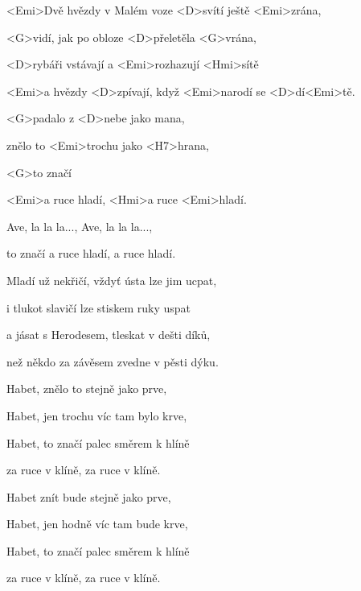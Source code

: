 

\zs
<Emi>Dvě hvězdy v Malém voze <D>svítí ještě <Emi>zrána,

<G>vidí, jak po obloze <D>přeletěla <G>vrána,

<D>rybáři vstávají a <Emi>rozhazují <Hmi>sítě

<Emi>a hvězdy <D>zpívají, když <Emi>narodí se <D>dí<Emi>tě.
\ks

\zr
{} <G>padalo z <D>nebe jako mana,

 znělo to <Emi>trochu jako <H7>hrana,

 <G>to značí 

<Emi>a ruce hladí, <Hmi>a ruce <Emi>hladí.

Ave, la la la..., Ave, la la la...,

 to značí  a ruce hladí, a ruce hladí.
\kr

\zs
Mladí už nekřičí, vždyť ústa lze jim ucpat,

i tlukot slavičí lze stiskem ruky uspat

a jásat s Herodesem, tleskat v dešti díků,

než někdo za závěsem zvedne v pěsti dýku.
\ks

\zr
Habet, znělo to stejně jako prve,

Habet, jen trochu víc tam bylo krve,

Habet, to značí palec směrem k hlíně

za ruce v klíně, za ruce v klíně.

Habet znít bude stejně jako prve,

Habet, jen hodně víc tam bude krve,

Habet, to značí palec směrem k hlíně

za ruce v klíně, za ruce v klíně.
\kr

\kp
